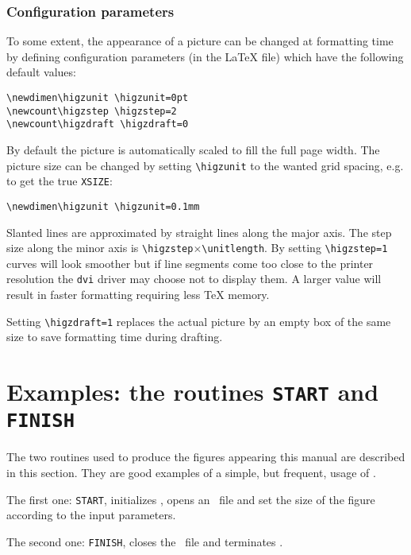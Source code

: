 \subsubsection{Configuration parameters}
To some extent, the appearance of a picture can be changed at formatting time
by defining configuration parameters (in the \LaTeX{} file) which have the
following default values:
\begin{verbatim}
\newdimen\higzunit \higzunit=0pt
\newcount\higzstep \higzstep=2
\newcount\higzdraft \higzdraft=0
\end{verbatim}
\par
{}
By default the picture is automatically scaled to fill the full page width.
The picture size can be changed by setting \verb'\higzunit' to the wanted grid
spacing, e.g. to get the true {\tt XSIZE}:
\begin{verbatim}
\newdimen\higzunit \higzunit=0.1mm
\end{verbatim}
\par
{}
Slanted lines are approximated by straight lines along the major axis.
The step size along the minor axis is
\verb'\higzstep'$\times$\verb'\unitlength'.
By setting \verb'\higzstep=1' curves will look smoother
but if line segments come too close to the printer resolution the
{\tt dvi} driver may choose not to display them.
A larger value will result in faster formatting requiring less \TeX{} memory.
\par
{}
Setting \verb'\higzdraft=1' replaces the actual picture by an empty box
of the same size to save formatting time during drafting.
%
\section{Examples: the routines {\tt START} and {\tt FINISH}}
The two routines used to produce the figures appearing this manual are
described in this section. They are good examples of a simple, but frequent,
usage of \HIGZ.

The first one: {\tt START}, initializes \HIGZ, opens an \EPS~file and set the
size of the figure according to the input parameters.

The second one: {\tt FINISH}, closes the \EPS~file and terminates \HIGZ.

